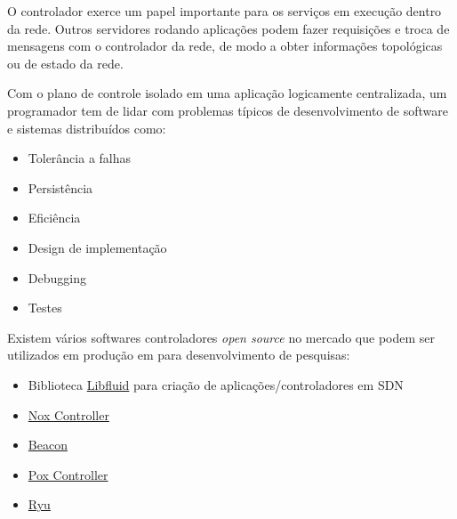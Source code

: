 O controlador exerce um papel importante para os serviços em execução dentro
da rede. 
Outros servidores rodando aplicações podem fazer requisições e troca de 
mensagens com o controlador da rede, de modo a obter informações topológicas
ou de estado da rede.

Com o plano de controle isolado em uma aplicação logicamente centralizada, 
um programador tem de lidar com problemas típicos de desenvolvimento de 
software e sistemas distribuídos como:

\begin{itemize}
    \item Tolerância a falhas
    \item Persistência
    \item Eficiência
    \item Design de implementação
    \item Debugging
    \item Testes
\end{itemize}

Existem vários softwares controladores \emph{open source} no mercado que 
podem ser utilizados em produção em para desenvolvimento de pesquisas:

\begin{itemize}
    \item Biblioteca \href{http://opennetworkingfoundation.github.io/libfluid/index.html}{Libfluid}
        para criação de aplicações/controladores em SDN \citep{libfluid2015}
    \item \href{http://www.noxrepo.org/nox/about-nox/}{Nox Controller}
        \citep{nox2015}
    \item \href{https://openflow.stanford.edu/display/Beacon/Home}{Beacon}
        \citep{beacon2015}
    \item \href{http://www.noxrepo.org/pox/about-pox/}{Pox Controller}
        \citep{pox2015}
    \item \href{http://osrg.github.io/ryu/}{Ryu} \citep{ryu2015}
\end{itemize}

